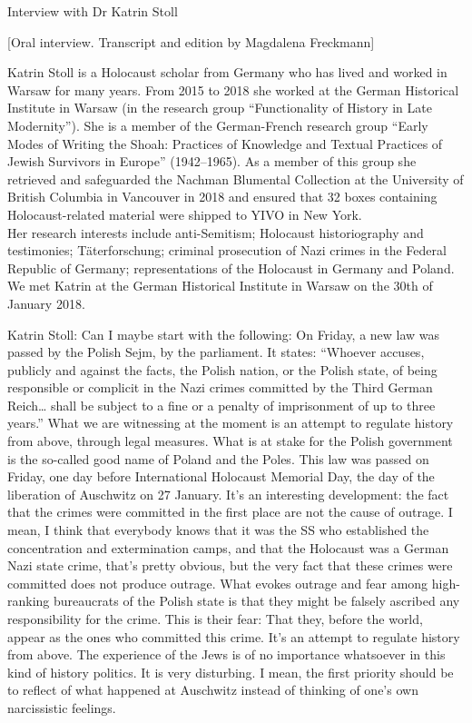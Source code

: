 Interview with Dr Katrin Stoll 

[Oral interview. Transcript and edition by Magdalena Freckmann] 

Katrin Stoll is a Holocaust scholar from Germany who has lived and worked in Warsaw for many years. From 2015 to 2018 she worked at the German Historical Institute in Warsaw (in the research group "`Functionality of History in Late Modernity"'). She is a member of the German-French research group "`Early Modes of Writing the Shoah: Practices of Knowledge and Textual Practices of Jewish Survivors in Europe"' (1942–1965). As a member of this group she retrieved and safeguarded the Nachman Blumental Collection at the University of British Columbia in Vancouver in 2018 and ensured that 32 boxes containing Holocaust-related material were shipped to YIVO in New York. \\
Her research interests include anti-Semitism; Holocaust historiography and testimonies; Täterforschung; criminal prosecution of Nazi crimes in the Federal Republic of Germany; representations of the Holocaust in Germany and Poland. \\
We met Katrin at the German Historical Institute in Warsaw on the 30th of January 2018. 

Katrin Stoll: Can I maybe start with the following: On Friday, a new law was passed by the Polish Sejm, by the parliament. It states: “Whoever accuses, publicly and against the facts, the Polish nation, or the Polish state, of being responsible or complicit in the Nazi crimes committed by the Third German Reich… shall be subject to a fine or a penalty of imprisonment of up to three years.” What we are witnessing at the moment is an attempt to regulate history from above, through legal measures.  What is at stake for the Polish government is the so-called good name of Poland and the Poles. This law was passed on Friday, one day before International Holocaust Memorial Day, the day of the liberation of Auschwitz on 27 January. It’s an interesting development: the fact that the crimes were committed in the first place are not the cause of outrage. I mean, I think that everybody knows that it was the SS who established the concentration and extermination camps, and that the Holocaust was a German Nazi state crime, that’s pretty obvious, but the very fact that these crimes were committed does not produce outrage. What evokes outrage and fear among high-ranking bureaucrats of the Polish state is that they might be falsely ascribed any responsibility for the crime. This is their fear: That they, before the world, appear as the ones who committed this crime. It’s an attempt to regulate history from above. The experience of the Jews is of no importance whatsoever in this kind of history politics. It is very disturbing. I mean, the first priority should be to reflect of what happened at Auschwitz instead of thinking of one’s own narcissistic feelings. 

